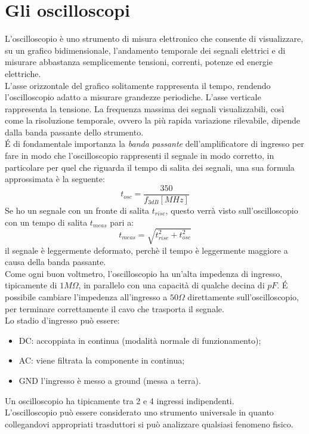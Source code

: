 \documentclass[12pt, letterpaper]{book}
\begin{document}
\section{Gli oscilloscopi}
L'oscilloscopio è uno strumento di misura elettronico che consente di visualizzare, su un grafico bidimensionale, l'andamento temporale dei segnali elettrici e di misurare abbastanza semplicemente tensioni, correnti, potenze ed energie elettriche.\\
L'asse orizzontale del grafico solitamente rappresenta il tempo, rendendo l'oscilloscopio adatto a misurare grandezze periodiche. L'asse verticale rappresenta la tensione. La frequenza massima dei segnali visualizzabili, così come la risoluzione temporale, ovvero la più rapida variazione rilevabile, dipende dalla banda passante dello strumento.\\
\'E di fondamentale importanza la \textit{banda passante} dell'amplificatore di ingresso per fare in modo che l’oscilloscopio rappresenti il segnale in modo corretto, in particolare per quel che riguarda il tempo di salita dei segnali, una sua formula approssimata è la seguente:
$$t_{osc}=\frac{350}{f_{3dB}[MHz]}$$
Se ho un segnale con un fronte di salita $t_{rise}$, questo verrà visto sull’oscilloscopio con un tempo di salita $t_{meas}$ pari a:
$$t_{meas}=\sqrt{t_{rise}^2+t_{osc}^2}$$
il segnale è leggermente deformato, perchè il tempo è leggermente maggiore a causa della banda passante.\\
Come ogni buon voltmetro, l'oscilloscopio ha un'alta impedenza di ingresso, tipicamente di $1M\Omega$, in parallelo con una capacità di qualche decina di $pF$. \'E possibile cambiare l'impedenza all'ingresso a $50\Omega$ direttamente sull'oscilloscopio, per terminare correttamente il cavo che trasporta il segnale.\\
Lo stadio d'ingresso può essere:
\begin{itemize}
    \item DC: accoppiata in continua (modalità normale di funzionamento);
    \item AC: viene filtrata la componente in continua;
    \item GND l'ingresso è messo a ground (messa a terra).
\end{itemize}
Un oscilloscopio ha tipicamente tra 2 e 4 ingressi indipendenti.\\
L'oscilloscopio può essere considerato uno strumento universale in quanto collegandovi appropriati trasduttori si può analizzare qualsiasi fenomeno fisico.\\
\end{document}
